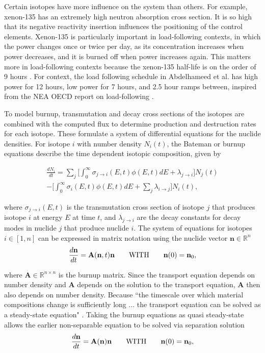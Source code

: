 \documentclass[letterpaper]{physor2024}
\begin{document}
Certain isotopes have more influence on the system than others. For example, xenon-135 has an extremely high neutron absorption cross section. It is so high that its negative reactivity insertion influences the positioning of the control elements. Xenon-135 is particularly important in load-following contexts, in which the power changes once or twice per day, as its concentration increases when power decreases, and it is burned off when power increases again. This matters more in load-following contexts because the xenon-135 half-life is on the order of 9 hours \cite{d-and-h}. For context, the load following schedule in Abdelhameed et al. has high power for 12 hours, low power for 7 hours, and 2.5 hour ramps between, inspired from the NEA OECD report on load-following \cite{Abdelhameed-ANS-2022,nea-oecd-LF}.

To model burnup, transmutation and decay cross sections of the isotopes are combined with the computed flux to determine production and destruction rates for each isotope. These formulate a system of differential equations for the nuclide densities. For isotope $i$ with number density $N_{i}(t)$, the Bateman or burnup equations describe the time dependent isotopic composition, given by

\begin{multline} \label{eq:batemen}
    \frac{dN_{i}}{dt} =
    \sum_{j} \bigg[\int_{0}^{\infty} \sigma_{j\rightarrow{i}}(E,t)\phi(E,t)dE + \lambda_{j\rightarrow{i}}\bigg]N_{j}(t) \\
    -\bigg[\int_{0}^{\infty} \sigma_{i}(E,t)\phi(E,t)dE
    +\sum_{j}\lambda_{i\rightarrow{j}}\bigg] N_{i}(t),
\end{multline}

\noindent where $\sigma_{j\rightarrow{i}}(E,t)$ is the transmutation cross section of isotope $j$ that produces isotope $i$ at energy $E$ at time $t$, and $\lambda_{j\rightarrow{i}}$ are the decay constants for decay modes in nuclide $j$ that produce nuclide $i$. The system of equations for isotopes $i\in[1,n]$ can be expressed in matrix notation using the nuclide vector $\mathbf{n}\in\mathbb{R}^{n}$
\begin{equation} \label{eq:burnup matrix odes}
    \frac{d\textbf{n}}{dt} =
    \textbf{A}(\textbf{n},t) \textbf{n}
    \qquad \text{WITH} \qquad
    \textbf{n}(0) = \textbf{n}_{0},
\end{equation}

\noindent where $\textbf{A}\in\mathbb{R}^{n\times n}$ is the burnup matrix. Since the transport equation depends on number density and $\textbf{A}$ depends on the solution to the transport equation, $\textbf{A}$ then also depends on number density. Because ``the timescale over which material compositions change is sufficiently long ... the transport equation can be solved as a steady-state equation" \cite{romano-depletion-2021}. Taking the burnup equations as quasi steady-state allows the earlier non-separable equation to be solved via separation solution
\begin{equation} \label{eq:separable burnup matrix odes}
    \frac{d\textbf{n}}{dt} =
    \textbf{A}(\textbf{n}) \textbf{n}
    \qquad \text{WITH} \qquad
    \textbf{n}(0) = \textbf{n}_{0},
\end{equation}
\end{document}
